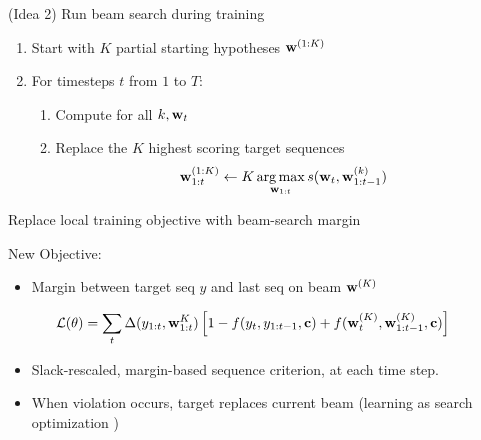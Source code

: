 \begin{frame}{(Idea 2)} Run beam search during training
  \begin{enumerate}
  \item Start with $K$ partial starting hypotheses $\mathbf{w}^{(1:K)}$
  \item For timesteps $t$ from  $1$ to $T$:
   \begin{enumerate}
   \item Compute for all $k, \mathbf{w}_{t}$
   \item Replace the  $K$ highest scoring target sequences
     \[\wvec_{1:t}^{(1:K)} \gets K\argmax_{\wvec_{1:t}} s(\wvec_t, \wvec_{1:t-1}^{(k)})\]  
   \end{enumerate}
  \end{enumerate}

\end{frame}


\begin{frame}{ Replace local training objective with beam-search margin}

  New Objective: 
  \begin{itemize}

  \item Margin between target seq $y$ and last seq on beam $\mathbf{w}^{(K)}$  
  \end{itemize}
\begin{align*}
 \mathcal{L}&(\theta) = \sum_{t} \Delta(y_{1:t}, \mathbf{w}_{1:t}^{K}) \left[1 - f(y_t, y_{1:t-1}, \mathbf{c}) +  f(\mathbf{w}_t^{(K)}, \mathbf{w}_{1:t-1}^{(K)}, \mathbf{c}) \right] 
\end{align*}

\begin{itemize}
  \item Slack-rescaled, margin-based sequence criterion, at each time step.  
\item When violation occurs, target replaces current beam (learning as search optimization \cite{daume05learning})
\end{itemize}

\end{frame}

